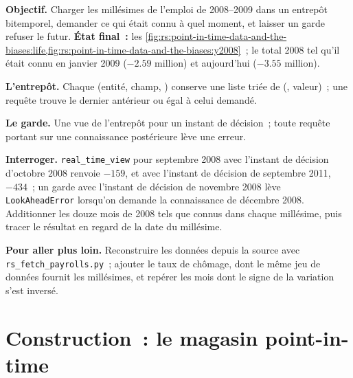 \begin{tutorial}
\textbf{Objectif.} Charger les millésimes de l'emploi de 2008--2009 dans un entrepôt bitemporel, demander ce qui était connu à quel moment, et laisser un garde refuser
le futur. \textbf{État final~:} les \cref{fig:rs:point-in-time-data-and-the-biases:life,fig:rs:point-in-time-data-and-the-biases:y2008}~;
le total 2008 tel qu'il était connu en janvier 2009 ($-2.59$ million) et aujourd'hui ($-3.55$ million).
\begin{tutsteps}
\item \textbf{L'entrepôt.} Chaque (entité, champ, ) conserve une liste triée de (, valeur)~; une requête trouve le
dernier  antérieur ou égal à celui demandé.
\label{lst:rs:point-in-time-data-and-the-biases:store}
\item \textbf{Le garde.} Une vue de l'entrepôt pour un instant de décision~; toute requête portant sur une connaissance postérieure lève une erreur.
\label{lst:rs:point-in-time-data-and-the-biases:guard}
\item \textbf{Interroger.} \texttt{real\_time\_view} pour septembre 2008 avec l'instant de décision d'octobre 2008 renvoie $-159$, et avec
l'instant de décision de septembre 2011, $-434$~; un garde avec l'instant de décision de novembre 2008 lève \texttt{LookAheadError} lorsqu'on demande la connaissance de
décembre 2008. Additionner les douze mois de 2008 tels que connus dans chaque millésime, puis tracer le résultat en regard de la date du millésime.
\end{tutsteps}
\textbf{Pour aller plus loin.} Reconstruire les données depuis la source avec \texttt{rs\_fetch\_payrolls.py}~; ajouter le taux de chômage,
dont le même jeu de données fournit les millésimes, et repérer les mois dont le signe de la variation s'est inversé.
\end{tutorial}

\section{Construction~: le magasin point-in-time}\label{bld:rs:point-in-time-data-and-the-biases:pit}

